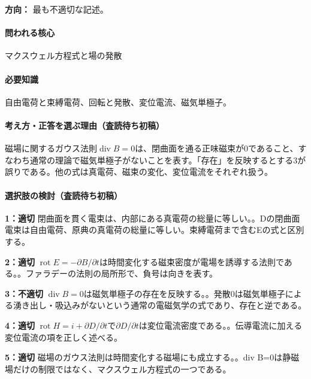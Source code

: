 \noindent\textbf{方向：} 最も不適切な記述。\par

\paragraph{問われる核心} マクスウェル方程式と場の発散

\paragraph{必要知識} 自由電荷と束縛電荷、回転と発散、変位電流、磁気単極子。

\paragraph{考え方・正答を選ぶ理由（査読待ち初稿）} 磁場に関するガウス法則\(\operatorname{div}B=0\)は、閉曲面を通る正味磁束が0であること、すなわち通常の理論で磁気単極子がないことを表す。「存在」を反映するとする3が誤りである。他の式は真電荷、磁束の変化、変位電流をそれぞれ扱う。

\paragraph{選択肢の検討（査読待ち初稿）}\mbox{}\par

\noindent\textbf{1：適切} 閉曲面を貫く電束は、内部にある真電荷の総量に等しい。。Dの閉曲面電束は自由電荷、原典の真電荷の総量に等しい。束縛電荷まで含むEの式と区別する。\par

\noindent\textbf{2：適切} \(\operatorname{rot}E=-\partial B/\partial t\)は時間変化する磁束密度が電場を誘導する法則である。。ファラデーの法則の局所形で、負号は向きを表す。\par

\noindent\textbf{3：不適切} \(\operatorname{div}B=0\)は磁気単極子の存在を反映する。。発散0は磁気単極子による湧き出し・吸込みがないという通常の電磁気学の式であり、存在と逆である。\par

\noindent\textbf{4：適切} \(\operatorname{rot}H=i+\partial D/\partial t\)で\(\partial D/\partial t\)は変位電流密度である。。伝導電流に加える変位電流の項を正しく述べる。\par

\noindent\textbf{5：適切} 磁場のガウス法則は時間変化する磁場にも成立する。。div B=\allowbreak{}0は静磁場だけの制限ではなく、マクスウェル方程式の一つである。\par


